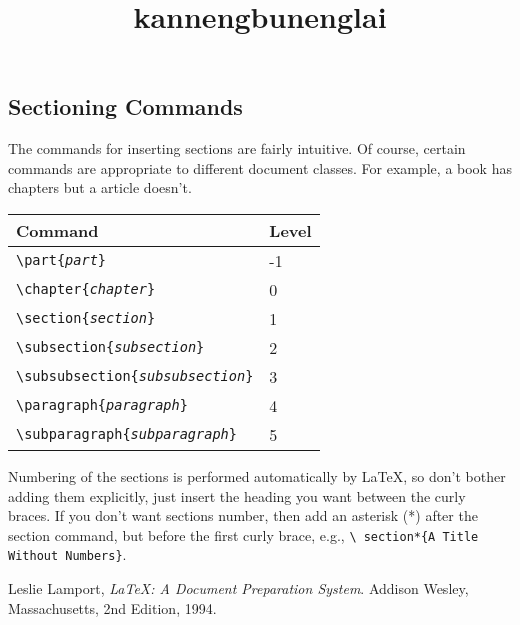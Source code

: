 \documentclass{article}
\begin{document}
	\subsection{Sectioning Commands}
	The commands for inserting sections are fairly intuitive.  Of course,
	certain commands are appropriate to different document classes.
	For example, a book has chapters but a article doesn't.
	
	\begin{center}
		\begin{tabular}{| l | l |} 
			
			\hline  %
			Command & Level \\ \hline  %
			\texttt{\textbackslash part\{\emph{part}\}} & -1 \\
			\texttt{\textbackslash chapter\{\emph{chapter}\}} & 0 \\
			\texttt{\textbackslash section\{\emph{section}\}} & 1 \\
			\texttt{\textbackslash subsection\{\emph{subsection}\}} & 2 \\
			\texttt{\textbackslash subsubsection\{\emph{subsubsection}\}} & 3 \\
			\texttt{\textbackslash paragraph\{\emph{paragraph}\}} & 4 \\
			\texttt{\textbackslash subparagraph\{\emph{subparagraph}\}} & 5 \\
			\hline
		\end{tabular}
	\end{center}
	
	Numbering of the sections is performed automatically by \LaTeX{}, so don't
	bother adding them explicitly, just insert the heading you want between
	the curly braces.  If you don't want sections number, then add an asterisk (*) after the
	section command, but before the first curly brace, e.g., \texttt{\textbackslash
		section*\{A Title Without Numbers\}}.
	
	\begin{thebibliography}{9}
		Leslie Lamport,
		\emph{\LaTeX: A Document Preparation System}.
		Addison Wesley, Massachusetts,
		2nd Edition,
		1994.
		\title{kannengbunenglai}
	\end{thebibliography} %
	
\end{document}
